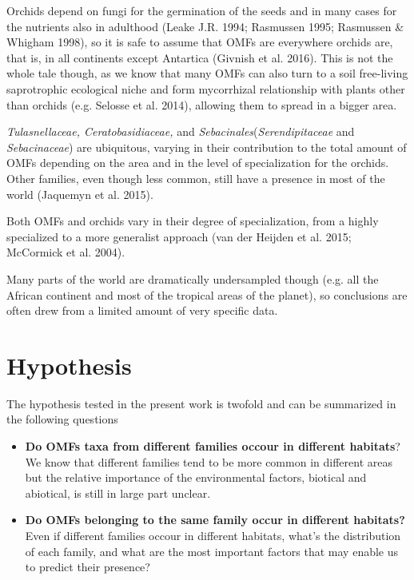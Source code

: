 Orchids depend on fungi for the germination of the seeds and in many cases for the nutrients also in adulthood (Leake J.R. 1994; Rasmussen 1995; Rasmussen \& Whigham 1998), so it is safe to assume that OMFs are everywhere orchids are, that is, in all continents except Antartica (Givnish et al. 2016). This is not the whole tale though, as we know that many OMFs can also turn to a soil free-living saprotrophic ecological niche and form mycorrhizal relationship with plants other than orchids (e.g. Selosse et al. 2014), allowing them to spread in a bigger area.

\emph{Tulasnellaceae, Ceratobasidiaceae,} and \emph{Sebacinales}(\emph{Serendipitaceae} and \emph{Sebacinaceae}) are ubiquitous, varying in their contribution to the total amount of OMFs depending on the area and in the level of specialization for the orchids.
Other families, even though less common, still have a presence in most of the world (Jaquemyn et al. 2015).

Both OMFs and orchids vary in their degree of specialization, from a highly specialized to a more generalist approach (van der Heijden et al. 2015; McCormick et al. 2004).

Many parts of the world are dramatically undersampled though (e.g. all the African continent and most of the tropical areas of the planet), so conclusions are often drew from a limited amount of very specific data.

\chapter{Hypothesis}
\label{hypothesis}

The hypothesis tested in the present work is twofold and can be summarized in the following questions

\begin{itemize}
\item \textbf{Do OMFs taxa from different families occour in different habitats}? We know that different families tend to be more common in different areas but the relative importance of the environmental factors, biotical and abiotical, is still in large part unclear.

\item \textbf{Do OMFs belonging to the same family occur in different habitats?} Even if different families occour in different habitats, what's the distribution of each family, and what are the most important factors that may enable us to predict their presence?

\end{itemize}

